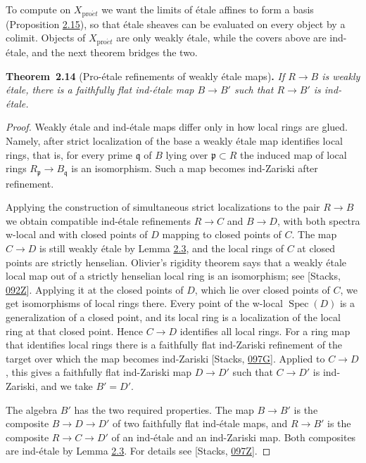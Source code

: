 \documentclass[11pt]{article}
\newenvironment{bpstatement}[2]{\par\addvspace{0.6\baselineskip}\noindent\textbf{#1}#2\textbf{.}\enspace\ignorespaces}
  {\par\addvspace{0.4\baselineskip}}
\newenvironment{bpstatementit}[2]{\begin{bpstatement}{#1}{#2}\itshape\ignorespaces}{\end{bpstatement}}
\begin{document}
\label{bp39}%
To compute on \(X_{\mathrm{pro}\acute{e}t}\) we want the limits of étale affines to form a basis (Proposition \hyperref[bp44]{2.15}), so that étale sheaves can be evaluated on every object by a colimit. Objects of \(X_{\mathrm{pro}\acute{e}t}\) are only weakly étale, while the covers above are ind-étale, and the next theorem bridges the two.

\label{bp40}%
\begin{bpstatementit}{Theorem~2.14}{ (Pro-étale refinements of weakly étale maps)}
If \(R\to B\) is weakly étale, there is a faithfully flat ind-étale map \(B\to B'\) such that \(R\to B'\) is ind-étale.
\end{bpstatementit}

\begin{proof}[{Proof}]\label{bp41}%
Weakly étale and ind-étale maps differ only in how local rings are glued. Namely, after strict localization of the base a weakly étale map identifies local rings, that is, for every prime \(\mathfrak q\) of \(B\) lying over \(\mathfrak p\subset R\) the induced map of local rings \(R_{\mathfrak p}\to B_{\mathfrak q}\) is an isomorphism. Such a map becomes ind-Zariski after refinement.

Applying the construction of simultaneous strict localizations to the pair \(R\to B\) we obtain compatible ind-étale refinements \(R\to C\) and \(B\to D\), with both spectra w-local and with closed points of \(D\) mapping to closed points of \(C\). The map \(C\to D\) is still weakly étale by Lemma \hyperref[bp10]{2.3}, and the local rings of \(C\) at closed points are strictly henselian. Olivier's rigidity theorem says that a weakly étale local map out of a strictly henselian local ring is an isomorphism; see [Stacks, \href{https://stacks.math.columbia.edu/tag/092Z}{092Z}]. Applying it at the closed points of \(D\), which lie over closed points of \(C\), we get isomorphisms of local rings there. Every point of the w-local \(\operatorname{Spec}(D)\) is a generalization of a closed point, and its local ring is a localization of the local ring at that closed point. Hence \(C\to D\) identifies all local rings. For a ring map that identifies local rings there is a faithfully flat ind-Zariski refinement of the target over which the map becomes ind-Zariski [Stacks, \href{https://stacks.math.columbia.edu/tag/097G}{097G}]. Applied to \(C\to D\), this gives a faithfully flat ind-Zariski map \(D\to D'\) such that \(C\to D'\) is ind-Zariski, and we take \(B'=D'\).

The algebra \(B'\) has the two required properties. The map \(B\to B'\) is the composite \(B\to D\to D'\) of two faithfully flat ind-étale maps, and \(R\to B'\) is the composite \(R\to C\to D'\) of an ind-étale and an ind-Zariski map. Both composites are ind-étale by Lemma \hyperref[bp10]{2.3}. For details see [Stacks, \href{https://stacks.math.columbia.edu/tag/097Z}{097Z}].
\end{proof}
\end{document}
